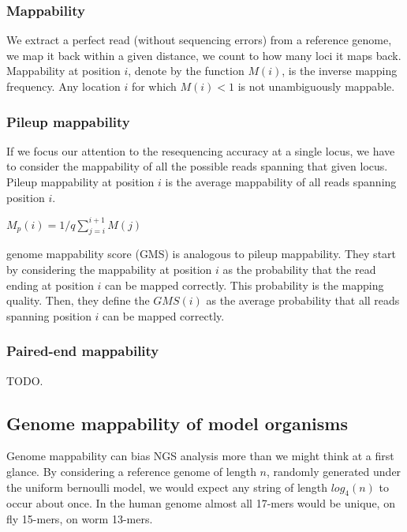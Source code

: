 \subsubsection{Mappability}

We extract a perfect read (without sequencing errors) from a reference genome, we map it back within a given distance, we count to how many loci it maps back.
Mappability at position $i$, denote by the function $M(i)$, is the inverse mapping frequency.
Any location $i$ for which $M(i) < 1$ is not unambiguously mappable.

\subsubsection{Pileup mappability}

If we focus our attention to the resequencing accuracy at a single locus, we have to consider the mappability of all the possible reads spanning that given locus.
Pileup mappability \citep{Derren2011} at position $i$ is the average mappability of all reads spanning position $i$.

$M_p(i) = 1/q \sum_{j=i}^{i+1}{M(j)}$

\citep{Lee2011} genome mappability score (GMS) is analogous to pileup mappability.
They start by considering the mappability at position $i$ as the probability that the read ending at position $i$ can be mapped correctly.
This probability is the mapping quality.
Then, they define the $GMS(i)$ as the average probability that all reads spanning position $i$ can be mapped correctly.

\begin{center}

\end{center}

\subsubsection{Paired-end mappability}

TODO.

\subsection{Genome mappability of model organisms}

Genome mappability can bias NGS analysis more than we might think at a first glance.
By considering a reference genome of length $n$, randomly generated under the uniform bernoulli model, we would expect any string of length $log_4(n)$ to occur about once.
In the human genome almost all 17-mers would be unique, on fly 15-mers, on worm 13-mers.

